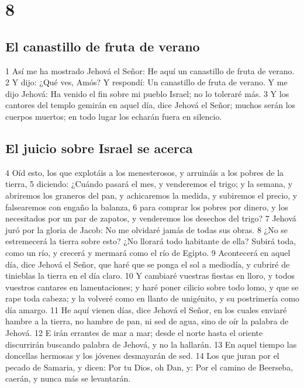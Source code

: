 \chapter{8}

\section*{El canastillo de fruta de verano}

1 Así me ha mostrado Jehová el Señor: He aquí un canastillo de fruta de verano.
2 Y dijo: ¿Qué ves, Amós? Y respondí: Un canastillo de fruta de verano. Y me dijo Jehová: Ha venido el fin sobre mi pueblo Israel; no lo toleraré más.
3 Y los cantores del templo gemirán en aquel día, dice Jehová el Señor; muchos serán los cuerpos muertos; en todo lugar los echarán fuera en silencio.

\section*{El juicio sobre Israel se acerca}

4 Oíd esto, los que explotáis a los menesterosos, y arruináis a los pobres de la tierra,
5 diciendo: ¿Cuándo pasará el mes, y venderemos el trigo; y la semana, y abriremos los graneros del pan, y achicaremos la medida, y subiremos el precio, y falsearemos con engaño la balanza,
6 para comprar los pobres por dinero, y los necesitados por un par de zapatos, y venderemos los desechos del trigo?
7 Jehová juró por la gloria de Jacob: No me olvidaré jamás de todas sus obras.
8 ¿No se estremecerá la tierra sobre esto? ¿No llorará todo habitante de ella? Subirá toda, como un río, y crecerá y mermará como el río de Egipto.
9 Acontecerá en aquel día, dice Jehová el Señor, que haré que se ponga el sol a mediodía, y cubriré de tinieblas la tierra en el día claro.
10 Y cambiaré vuestras fiestas en lloro, y todos vuestros cantares en lamentaciones; y haré poner cilicio sobre todo lomo, y que se rape toda cabeza; y la volveré como en llanto de unigénito, y su postrimería como día amargo.
11 He aquí vienen días, dice Jehová el Señor, en los cuales enviaré hambre a la tierra, no hambre de pan, ni sed de agua, sino de oír la palabra de Jehová.
12 E irán errantes de mar a mar; desde el norte hasta el oriente discurrirán buscando palabra de Jehová, y no la hallarán.
13 En aquel tiempo las doncellas hermosas y los jóvenes desmayarán de sed.
14 Los que juran por el pecado de Samaria, y dicen: Por tu Dios, oh Dan, y: Por el camino de Beerseba, caerán, y nunca más se levantarán.

